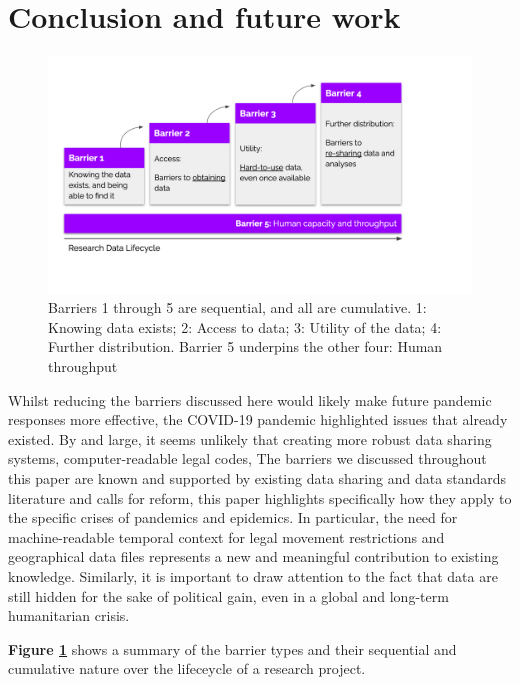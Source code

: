 \documentclass{CUP-JNL-DAP}%
\begin{document}
\section{Conclusion and future work}

\begin{figure}
    \centering
    \includegraphics[width=1\linewidth]{figures/figure-barriers.png}
    \caption{Barriers 1 through 5 are sequential, and all are cumulative. 1: Knowing data exists; 2: Access to data; 3: Utility of the data; 4: Further distribution. Barrier 5 underpins the other four: Human throughput}
    \label{fig:fig-barriers}
\end{figure}

Whilst reducing the barriers discussed here would likely make future pandemic responses more effective, the COVID-19 pandemic highlighted issues that already existed. By and large, it seems unlikely that creating more robust data sharing systems, computer-readable legal codes, 
The barriers we discussed throughout this paper are known and supported by existing data sharing and data standards literature and calls for reform, this paper highlights specifically how they apply to the specific crises of pandemics and epidemics. In particular, the need for machine-readable temporal context for legal movement restrictions and geographical data files represents a new and meaningful contribution to existing knowledge. Similarly, it is important to draw attention to the fact that data are still hidden for the sake of political gain, even in a global and long-term humanitarian crisis. 

\textbf{Figure \ref{fig:fig-barriers} }shows a summary of the barrier types and their sequential and cumulative nature over the lifeceycle of a research project. 
\end{document}
